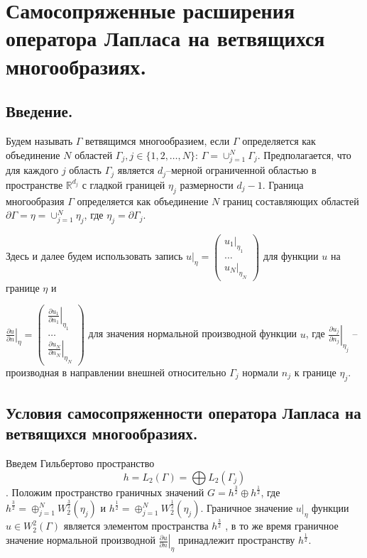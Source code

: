 \chapter{Самосопряженные расширения оператора Лапласа на ветвящихся многообразиях.}\label{ch:ch5}

\section{Введение.}\label{sec:ch5/sect1}
Будем называть $\Gamma$ ветвящимся многообразием, если $\Gamma$ определяется как объединение $N$ областей $\Gamma_j, j \in \{1, 2, \ldots, N\}$: $\Gamma = \cup_{j=1}^N \Gamma_j$. Предполагается, что для каждого $j$ область $\Gamma_j$ является $d_j$--мерной ограниченной областью в пространстве $\mathbb{R}^{d_j}$ с гладкой границей $\eta_j$ размерности $d_j-1$. Граница многообразия $\Gamma$ определяется как объединение $N$ границ составляющих областей $\partial \Gamma = \eta = \cup_{j=1}^N\eta_j$, где $\eta_j = \partial \Gamma_j$. 

Здесь и далее будем использовать запись 
$\left. u \right|_\eta = 
\begin{pmatrix}
\left. u_1 \right|_{\eta_1} \\
\ldots \\
\left. u_N \right|_{\eta_N}
\end{pmatrix}
$ для функции $u$ на границе $\eta$ и 

$\left. \frac{\partial u}{\partial n} \right|_\eta = 
\begin{pmatrix}
\left. \frac{\partial u_1}{\partial n_1} \right|_{\eta_1} \\
\ldots \\
\left. \frac{\partial u_N}{\partial n_N} \right|_{\eta_N}
\end{pmatrix}
$ для значения нормальной производной функции $u$, где $\left. \frac{\partial u_j}{\partial n_j} \right|_{\eta_j}$ -- производная в направлении внешней относительно $\Gamma_j$ нормали $n_j$ к границе $\eta_j$.


\section{Условия самосопряженности оператора Лапласа на ветвящихся многообразиях.}\label{sec:ch5/sect2}
Введем Гильбертово пространство $$h = L_2(\Gamma) = \bigoplus L_2(\Gamma_j)$$.
Положим пространство граничных значений $G = h^\frac{3}{2} \oplus h^\frac{1}{2}$, где 
$ h^\frac{3}{2} = \oplus_{j=1}^N W_2^\frac{3}{2}(\eta_j)$ и $ h^\frac{1}{2} = \oplus_{j=1}^N W_2^\frac{1}{2}(\eta_j)$.
Граничное значение $\left. u \right|_\eta$ функции $u \in W_2^2(\Gamma)$ является элементом пространства $h^\frac{3}{2}$ \cite{Jakovlev_1967}, в то же время граничное значение нормальной производной $\left. \frac{\partial u}{\partial n} \right|_\eta$ принадлежит пространству $h^\frac{1}{2}$. 

